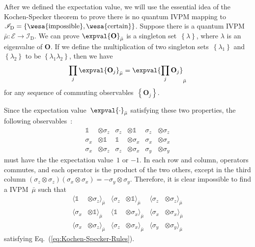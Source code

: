 \documentclass[english,reprint, aps, prl,superscriptaddress, showpacs,
showkeys, longbibliography, amsmath, amssymb]{revtex4-1}
\theoremstyle{plain}
\theoremstyle{definition}
\newcommand{\events}{\ensuremath{\mathcal{E}}}
\newcommand{\imposs}{{\text{\wesa{impossible}}}}
\newcommand{\necess}{{\text{\wesa{certain}}}}
\begin{document}
After we defined the expectation value, we will use the essential
idea of the Kochen-Specker theorem to prove there is no quantum IVPM
mapping to $\mathscr{I}_{\mathrm{D}}=\left\{ \imposs,\necess\right\} $.
Suppose there is a quantum IVPM~$\bar{\mu}:\events\rightarrow\mathscr{I}_{\mathrm{D}}$.
We can prove $\expval{\mathbf{O}}_{\bar{\mu}}$ is a singleton set~$\left\{ \lambda\right\} $,
where $\lambda$ is an eigenvalue of $\mathbf{O}$. If we define the
multiplication of two singleton sets~$\left\{ \lambda_{1}\right\} $
and $\left\{ \lambda_{2}\right\} $ to be $\left\{ \lambda_{1}\lambda_{2}\right\} $,
then we have 
\begin{equation}
\prod_{j}\expval{\mathbf{O}_{j}}_{\bar{\mu}}=\expval{\prod_{j}\mathbf{O}_{j}}_{\bar{\mu}}\label{eq:Kochen-Specker-Rules}
\end{equation}
for any sequence of commuting observables~$\left\{ \mathbf{O}_{j}\right\} $.

Since the expectation value~$\expval{\cdot}_{\bar{\mu}}$ satisfying
these two properties, the following observables~\cite{Mermin1990Simple,peres1995quantum}:
\begin{equation}
\begin{aligned}\mathbb{1} & \otimes\sigma_{z} & \sigma_{z} & \otimes\mathbb{1} & \sigma_{z} & \otimes\sigma_{z}\\
\sigma_{x} & \otimes\mathbb{1} & \mathbb{1} & \otimes\sigma_{x} & \sigma_{x} & \otimes\sigma_{x}\\
\sigma_{x} & \otimes\sigma_{z} & \sigma_{z} & \otimes\sigma_{x} & \sigma_{y} & \otimes\sigma_{y}
\end{aligned}
\label{eq:MerminSquare}
\end{equation}
must have the the expectation value~$1$ or $-1$. In each row and
column, operators commutes, and each operator is the product of the
two others, except in the third column $\left(\sigma_{z}\otimes\sigma_{z}\right)\left(\sigma_{x}\otimes\sigma_{x}\right)=-\sigma_{y}\otimes\sigma_{y}$.
Therefore, it is clear impossible to find a IVPM~$\bar{\mu}$ such
that 
\begin{equation}
\begin{aligned}\langle\mathbb{1} & \otimes\sigma_{z}\rangle_{\bar{\mu}} & \langle\sigma_{z} & \otimes\mathbb{1}\rangle_{\bar{\mu}} & \langle\sigma_{z} & \otimes\sigma_{z}\rangle_{\bar{\mu}}\\
\langle\sigma_{x} & \otimes\mathbb{1}\rangle_{\bar{\mu}} & \langle\mathbb{1} & \otimes\sigma_{x}\rangle_{\bar{\mu}} & \langle\sigma_{x} & \otimes\sigma_{x}\rangle_{\bar{\mu}}\\
\langle\sigma_{x} & \otimes\sigma_{z}\rangle_{\bar{\mu}} & \langle\sigma_{z} & \otimes\sigma_{x}\rangle_{\bar{\mu}} & \langle\sigma_{y} & \otimes\sigma_{y}\rangle_{\bar{\mu}}
\end{aligned}
\label{eq:MerminSquare-values}
\end{equation}
satisfying Eq.~(\ref{eq:Kochen-Specker-Rules}).
\end{document}
